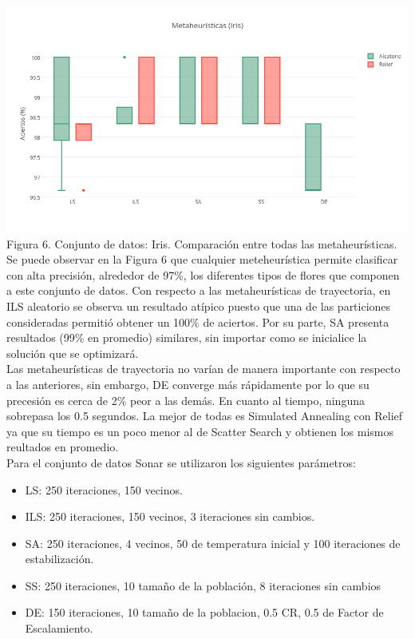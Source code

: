 \documentclass{ci5652}
\begin{document}
\includegraphics[width=\columnwidth]{metaheuristicas_Iris}
{\small Figura 6. Conjunto de datos: Iris. Comparación entre todas las
metaheurísticas.}\\

Se puede observar en la Figura 6 que cualquier meteheurística permite clasificar
con alta precisión, alrededor de 97\%, los diferentes tipos de flores que
componen a este conjunto de datos. Con respecto a las metaheurísticas de
trayectoria, en ILS aleatorio se observa un resultado atípico puesto que una de
las particiones consideradas permitió obtener un 100\% de aciertos. Por su parte,
SA presenta resultados (99\% en promedio) similares, sin importar como se
inicialice la solución que se optimizará.\\

Las metaheurísticas de trayectoria no varían de manera importante con respecto a
las anteriores, sin embargo, DE converge más rápidamente por lo que su precesión
es cerca de 2\% peor a las demás. En cuanto al tiempo, ninguna sobrepasa los 0.5
segundos. La mejor de todas es Simulated Annealing con Relief ya que su tiempo es
un poco menor al de Scatter Search y obtienen los mismos reultados en promedio.\\

Para el conjunto de datos Sonar se utilizaron los siguientes parámetros:
\begin{itemize}
  \item LS: 250 iteraciones, 150 vecinos.
  \item ILS: 250 iteraciones, 150 vecinos, 3 iteraciones sin cambios.
  \item SA: 250 iteraciones, 4 vecinos, 50 de temperatura inicial y 100
  iteraciones de estabilización.
  \item SS: 250 iteraciones, 10 tamaño de la población, 8 iteraciones sin
  cambios
  \item DE: 150 iteraciones, 10 tamaño de la poblacion, 0.5 CR, 0.5 de Factor de
  Escalamiento.
\end{itemize}
\end{document}
